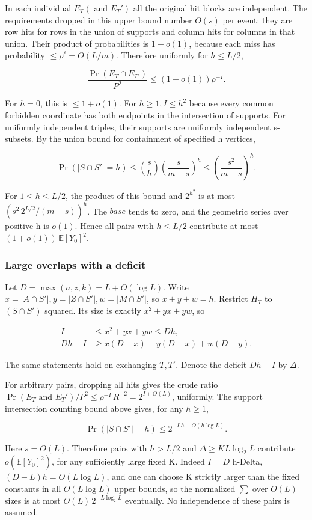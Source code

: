 \documentclass[11pt]{article}
\begin{document}
In each individual $E_{T} (\text{ and } E_{T}')$ all the original hit blocks are independent. The requirements dropped in this upper bound number $O(s)$ per event: they are row hits for rows in the union of supports and column hits for columns in that union. Their product of probabilities is $1-o(1)$, because each miss has probability $\leq \rho ^{\ell }=O(L/m)$. Therefore uniformly for $h\leq L/2$,

\[
\frac{\Pr(E_T\cap E_{T'})}{P^2}\leq(1+o(1))\rho^{-I}.
\]

For $h=0$, this is $\leq 1+o(1)$. For $h\geq 1, I\leq h^{2}$ because every common forbidden coordinate has both endpoints in the intersection of supports. For uniformly independent triples, their supports are uniformly independent s-subsets. By the union bound for containment of specified h vertices,

\[
\Pr(|S\cap S'|=h)\leq\binom sh\left(\frac{s}{m-s}\right)^h
\leq\left(\frac{s^2}{m-s}\right)^h.
\]

For $1\leq h\leq L/2$, the product of this bound and $2^{h^{2}}$ is at most $(s^{2}\,2^{L/2}/(m-s))^{h}$. The $base$ tends to zero, and the geometric series over positive h is $o(1)$. Hence all pairs with $h\leq L/2$ contribute at most $(1+o(1))\,\mathbb E[Y_{0}]^{2}$.

\subsubsection{Large overlaps with a deficit}

Let $D=\max (a,z,k)=L+O(\log  L)$. Write $x=|A \cap  S'|, y=|Z \cap  S'|, w=|M \cap  S'|$, so $x+y+w=h$. Restrict $H_{T}$ to $(S \cap  S')$ squared. Its size is exactly $x^{2}+yx+yw$, so

\[
\begin{aligned}
I&\leq x^2+yx+yw\leq Dh,\\
Dh-I&\geq x(D-x)+y(D-x)+w(D-y).
\end{aligned}
\]

The same statements hold on exchanging $T,T'$. Denote the deficit $D h-I$ by $\Delta $.

For arbitrary pairs, dropping all hits gives the crude ratio $\Pr(E_{T} \text{ and } E_{T}')/P^{2} \leq \rho ^{-I}\,R^{-2}=2^{I+O(L)}$, uniformly. The support intersection counting bound above gives, for any $h\geq 1$,

\[
\Pr(|S\cap S'|=h)\leq 2^{-Lh+O(h\log L)}.
\]

Here $s=O(L)$. Therefore pairs with $h>L/2 \text{ and } \Delta \geq K L \log _{2} L$ contribute $o(\mathbb E[Y_{0}]^{2})$, for any sufficiently large fixed K. Indeed $I=D$ h-Delta, $(D-L)h=O(L \log  L)$, and one can choose K strictly larger than the fixed constants in all $O(L \log  L)$ upper bounds, so the normalized $\sum $ over $O(L)$ sizes is at most $O(L)\,2^{-L \log _{2} L}$ eventually. No independence of these pairs is assumed.
\end{document}

